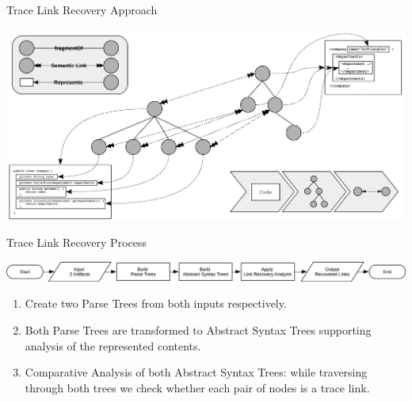 \documentclass{beamer}
\begin{document}
\begin{frame}{Trace Link Recovery Approach}
\begin{center}
\includegraphics[width=\textwidth]{RecoveryApproach.png}
\end{center}
\pagebreak
Trace Link Recovery Process
\begin{center}
\includegraphics[width=\textwidth]{RecoveryProcess.png}
\end{center}
\begin{enumerate}
\item
Create two Parse Trees from both inputs respectively.
\item
Both Parse Trees are transformed to Abstract Syntax Trees supporting analysis of the represented contents.
\item
Comparative Analysis of both Abstract Syntax Trees:
while traversing through both trees we check whether each pair of nodes is a trace link.
\end{enumerate}
\end{frame}
\end{document}
